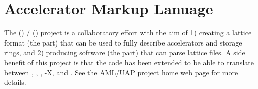 \section{Accelerator Markup Lanuage}
\label{s:aml}

The  () /  () project\cite{b:aml} is a collaboratory
effort with the aim of 1) creating a lattice format (the  part)
that can be used to fully describe accelerators and storage rings, and
2) producing software (the  part) that can parse 
lattice files. A side benefit of this project is that the  code
has been extended to be able to translate between , \bmad, ,
\mad-X, and . See the AML/UAP project home web page for more details.


